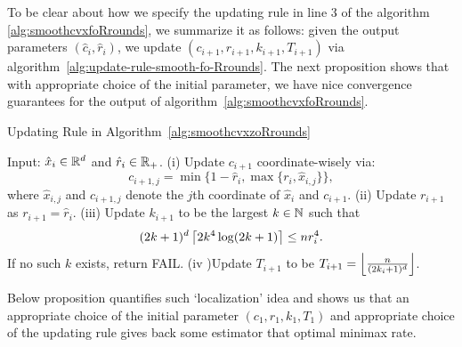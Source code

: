 To be clear about how we specify the updating rule in line 3 of the algorithm 
\ref{alg:smoothcvxfoRrounds}, we summarize it as follows: given the output 
parameters $(\hat{c}_i, \hat{r}_i)$, we update $(c_{i+1}, r_{i+1}, k_{i+1}, T_{i+1})$ via
algorithm~\ref{alg:update-rule-smooth-fo-Rrounds}. The next proposition shows 
that with appropriate choice of the initial parameter, we have nice convergence 
guarantees for the output of algorithm~\ref{alg:smoothcvxfoRrounds}.

\begin{algorithm}[htp]
\caption{Updating Rule in Algorithm~\ref{alg:smoothcvxzoRrounds}}
\begin{algorithmic}
  \Statex Input: $\hat{x}_i \in \mathbb{R}^d$ and $\hat{r}_i \in \mathbb{R}_+$.
  \State (i) Update $c_{i+1}$ coordinate-wisely via: 
  	\begin{equation*}
		c_{i+1, j} = \min\{1-\hat{r}_i, \max\{r_i, \hat{x}_{i, j}\}\},
	\end{equation*}
	where $\hat{x}_{i, j}$ and $c_{i+1, j}$ denote the $j$th coordinate of 
		$\hat{x}_i$ and $c_{i+1}$. 
  \State (ii) Update $r_{i+1}$ as $r_{i+1} = \hat{r}_i$.
  \State (iii) Update $k_{i+1}$ to be the largest $k \in \mathbb{N}$ such that 
  	\begin{equation} 
		\label{eqn:existence-of-k-i+1-r-rounds-zo}
		(2k + 1)^d \left\lceil{2k^4 \log (2k+1)}\right\rceil \leq nr_i^4.
	\end{equation}
  	 If no such $k$ exists, return FAIL. 
  \State (iv )Update $T_{i+1}$ to be $T_{i+1} = \left\lfloor{\frac{n}{(2k_i+1)^d}}\right\rfloor$.
\end{algorithmic}
\label{alg:update-rule-smooth-zo-Rrounds}
\end{algorithm}


Below proposition quantifies such `localization' idea and shows us that 
an appropriate choice of the initial parameter $(c_1, r_1, k_1, T_1)$ and 
appropriate choice of the updating rule gives back some estimator that 
optimal minimax rate. 

